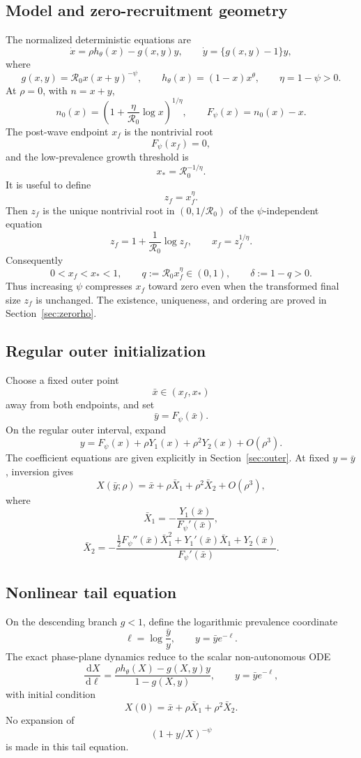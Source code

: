 \documentclass[11pt]{article}
\newcommand{\Rzero}{\mathcal R_0}
\newcommand{\hth}{h_\theta}
\newcommand{\Fpsi}{F_\psi}
\newcommand{\xf}{x_f}
\newcommand{\xs}{x_*}
\newcommand{\dd}{\,\mathrm{d}}
\begin{document}
\subsection{Model and zero-recruitment geometry}
The normalized deterministic equations are
\[
\dot x=\rho\hth(x)-g(x,y)y,
\qquad
\dot y=\{g(x,y)-1\}y,
\]
where
\[
g(x,y)=\Rzero x(x+y)^{-\psi},
\qquad
\hth(x)=(1-x)x^\theta,
\qquad
\eta=1-\psi>0.
\]
At $\rho=0$, with $n=x+y$,
\[
n_0(x)=\left(1+\frac{\eta}{\Rzero}\log x\right)^{1/\eta},
\qquad
\Fpsi(x)=n_0(x)-x.
\]
The post-wave endpoint $\xf$ is the nontrivial root
\[
\Fpsi(\xf)=0,
\]
and the low-prevalence growth threshold is
\[
\xs=\Rzero^{-1/\eta}.
\]
It is useful to define
\[
z_f=\xf^\eta.
\]
Then $z_f$ is the unique nontrivial root in $(0,1/\Rzero)$ of the $\psi$-independent equation
\[
\boxed{z_f=1+\frac1{\Rzero}\log z_f},
\qquad
\boxed{\xf=z_f^{1/\eta}}.
\]
Consequently
\[
0<\xf<\xs<1,
\qquad
q:=\Rzero\xf^\eta\in(0,1),
\qquad
\delta:=1-q>0.
\]
Thus increasing $\psi$ compresses $\xf$ toward zero even when the transformed final size $z_f$ is unchanged. The existence, uniqueness, and ordering are proved in Section~\ref{sec:zerorho}.

\subsection{Regular outer initialization}
Choose a fixed outer point
\[
\bar x\in(\xf,\xs)
\]
away from both endpoints, and set
\[
\bar y=\Fpsi(\bar x).
\]
On the regular outer interval, expand
\[
y=\Fpsi(x)+\rho Y_1(x)+\rho^2Y_2(x)+O(\rho^3).
\]
The coefficient equations are given explicitly in Section~\ref{sec:outer}. At fixed $y=\bar y$, inversion gives
\[
X(\bar y;\rho)=\bar x+\rho \bar X_1+\rho^2\bar X_2+O(\rho^3),
\]
where
\[
\bar X_1=-\frac{Y_1(\bar x)}{\Fpsi'(\bar x)},
\]
\[
\bar X_2=-\frac{\frac12\Fpsi''(\bar x)\bar X_1^2+Y_1'(\bar x)\bar X_1+Y_2(\bar x)}{\Fpsi'(\bar x)}.
\]

\subsection{Nonlinear tail equation}
On the descending branch $g<1$, define the logarithmic prevalence coordinate
\[
\ell=\log\frac{\bar y}{y},
\qquad
 y=\bar y e^{-\ell}.
\]
The exact phase-plane dynamics reduce to the scalar non-autonomous ODE
\[
\boxed{
\frac{\dd X}{\dd\ell}
=
\frac{\rho\hth(X)-g(X,y)y}{1-g(X,y)},
\qquad
 y=\bar y e^{-\ell},
}
\]
with initial condition
\[
X(0)=\bar x+\rho\bar X_1+\rho^2\bar X_2.
\]
No expansion of
\[
(1+y/X)^{-\psi}
\]
is made in this tail equation.
\end{document}
